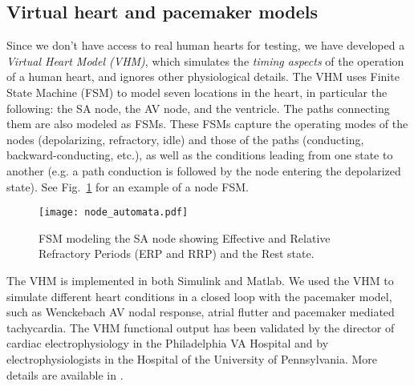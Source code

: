 \subsection{Virtual heart and pacemaker models}
\label{heartmodel}

Since we don't have access to real human hearts for testing, we have developed a \emph{Virtual Heart Model (VHM)}, which simulates the \emph{timing aspects} of the operation of a human heart, and ignores other physiological details.
The VHM uses Finite State Machine (FSM) to model seven locations in the heart, in particular the following: the SA node, the AV node, and the ventricle.
The paths connecting them are also modeled as FSMs.
These FSMs capture the operating modes of the nodes (depolarizing, refractory, idle) and those of the paths (conducting, backward-conducting, etc.), as well as the conditions leading from one state to another (e.g. a path conduction is followed by the node entering the depolarized state).
See Fig.~\ref{fig:FSMSA} for an example of a node FSM.
\begin{figure}[t]
\centering
\texttt{[image: node\_automata.pdf]}
\caption{FSM modeling the SA node showing Effective and Relative Refractory Periods (ERP and RRP) and the Rest state.}
\label{fig:FSMSA}
\end{figure}
The VHM is implemented in both Simulink and Matlab. 
We used the VHM to simulate different heart conditions in a closed loop with the pacemaker model, such as Wenckebach AV nodal response, atrial flutter and pacemaker mediated tachycardia.
The VHM functional output has been validated by the director of cardiac electrophysiology in the Philadelphia VA Hospital and by electrophysiologists in the Hospital of the University of Pennsylvania. 
More details are available in \cite{Jiang1}\cite{vhm_iccps11}\cite{embc10}.

